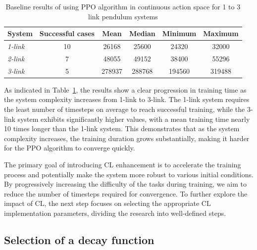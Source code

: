 \begin{table}[ht]
	\centering
	\caption{Baseline results of using PPO algorithm in continuous action space for 1 to 3 link pendulum systems}
	\begin{tabular}{@{}lccccc@{}}
		\toprule
		\textbf{System} & \textbf{Successful cases} & \textbf{Mean} & \textbf{Median} & \textbf{Minimum} & \textbf{Maximum} \\ \midrule
		\textit{1-link} & 10 & 26168 & 25600 & 24320 & 32000 \\
		\textit{2-link} & 7 & 48055 & 49152 & 38400 & 55296 \\
		\textit{3-link} & 5 & 278937 & 288768 & 194560 & 319488 \\ \bottomrule
	\end{tabular}
	\label{tab: baseline statistics for PPO in continuous action space}
\end{table}

As indicated in Table~\ref{tab: baseline statistics for PPO in continuous action space}, the results show a clear progression in training time as the system complexity increases from 1-link to 3-link. The 1-link system requires the least number of timesteps on average to reach successful training, while the 3-link system exhibits significantly higher values, with a mean training time nearly 10 times longer than the 1-link system. This demonstrates that as the system complexity increases, the training duration grows substantially, making it harder for the PPO algorithm to converge quickly.

The primary goal of introducing CL enhancement is to accelerate the training process and potentially make the system more robust to various initial conditions. By progressively increasing the difficulty of the tasks during training, we aim to reduce the number of timesteps required for convergence. To further explore the impact of CL, the next step focuses on selecting the appropriate CL implementation parameters, dividing the research into well-defined steps. 

\subsection{Selection of a decay function}

